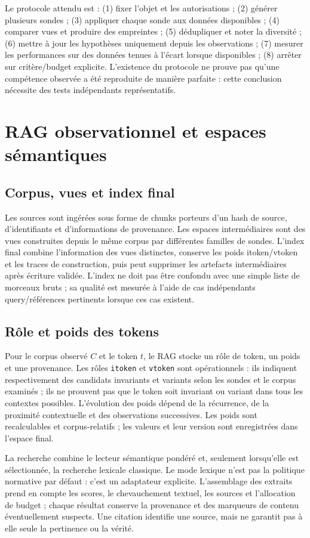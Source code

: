 \documentclass[11pt,a4paper]{article}
\begin{document}
Le protocole attendu est : (1) fixer l'objet et les autorisations ; (2) générer plusieurs sondes ; (3) appliquer chaque sonde aux données disponibles ; (4) comparer vues et produire des empreintes ; (5) dédupliquer et noter la diversité ; (6) mettre à jour les hypothèses uniquement depuis les observations ; (7) mesurer les performances sur des données tenues à l'écart lorsque disponibles ; (8) arrêter sur critère/budget explicite. L'existence du protocole ne prouve pas qu'une compétence observée a été reproduite de manière parfaite : cette conclusion nécessite des tests indépendants représentatifs.

\section{RAG observationnel et espaces sémantiques}
\subsection{Corpus, vues et index final}
Les sources sont ingérées sous forme de chunks porteurs d'un hash de source, d'identifiants et d'informations de provenance. Les espaces intermédiaires sont des vues construites depuis le même corpus par différentes familles de sondes. L'index final combine l'information des vues distinctes, conserve les poids itoken/vtoken et les traces de construction, puis peut supprimer les artefacts intermédiaires après écriture validée. L'index ne doit pas être confondu avec une simple liste de morceaux bruts ; sa qualité est mesurée à l'aide de cas indépendants query/références pertinents lorsque ces cas existent.

\subsection{Rôle et poids des tokens}
Pour le corpus observé $C$ et le token $t$, le RAG stocke un rôle de token, un poids et une provenance. Les rôles \texttt{itoken} et \texttt{vtoken} sont opérationnels : ils indiquent respectivement des candidats invariants et variants selon les sondes et le corpus examinés ; ils ne prouvent pas que le token soit invariant ou variant dans tous les contextes possibles. L'évolution des poids dépend de la récurrence, de la proximité contextuelle et des observations successives. Les poids sont recalculables et corpus-relatifs ; les valeurs et leur version sont enregistrées dans l'espace final.

La recherche combine le lecteur sémantique pondéré et, seulement lorsqu'elle est sélectionnée, la recherche lexicale classique. Le mode lexique n'est pas la politique normative par défaut : c'est un adaptateur explicite. L'assemblage des extraits prend en compte les scores, le chevauchement textuel, les sources et l'allocation de budget ; chaque résultat conserve la provenance et des marqueurs de contenu éventuellement suspects. Une citation identifie une source, mais ne garantit pas à elle seule la pertinence ou la vérité.
\end{document}
